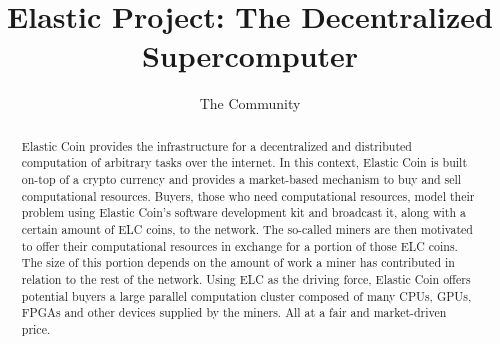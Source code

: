 \documentclass{sig-alternate}
\begin{document}



\title{Elastic Project: The Decentralized Supercomputer}



\author{
\alignauthor%
The Community
}

\maketitle
\begin{abstract}
Elastic Coin provides the infrastructure for a decentralized and distributed computation of arbitrary tasks over the internet.
In this context, Elastic Coin is built on-top of a crypto currency and provides a market-based mechanism to buy and sell computational resources. Buyers, those who need computational resources, model their problem using Elastic Coin's software development kit and broadcast it, along with a certain amount of ELC coins, to the network. The so-called miners are then motivated to offer their computational resources in exchange for a portion of those ELC coins. The size of this portion depends on the amount of work a miner has contributed in relation to the rest of the network. Using ELC as the driving force, Elastic Coin offers potential buyers a large parallel computation cluster composed of many CPUs, GPUs, FPGAs and other devices supplied by the miners. All at a fair and market-driven price.

\end{abstract}
\end{document}
